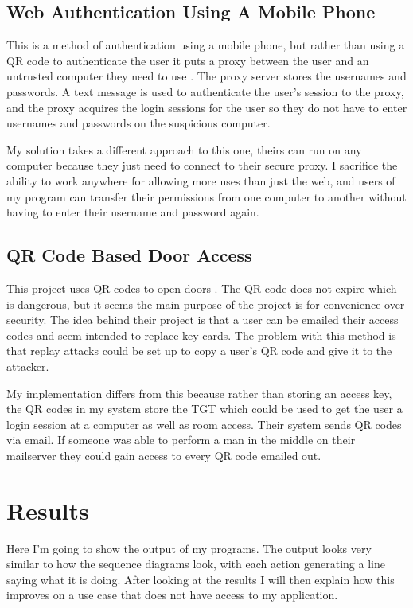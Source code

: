 \documentclass[]{report}   %
\begin{document}
\subsection {Web Authentication Using A Mobile Phone}
This is a method of authentication using a mobile phone, but rather than using a QR code to authenticate the user it puts a proxy between the user and an untrusted computer they need to use \cite{MobileRelated}. The proxy server stores the usernames and passwords. A text message is used to authenticate the user's session to the proxy, and the proxy acquires the login sessions for the user so they do not have to enter usernames and passwords on the suspicious computer.

My solution takes a different approach to this one, theirs can run on any computer because they just need to connect to their secure proxy. I sacrifice the ability to work anywhere for allowing more uses than just the web, and users of my program can transfer their permissions from one computer to another without having to enter their username and password again. 

\subsection{QR Code Based Door Access}
This project uses QR codes to open doors \cite{QRRelated}. The QR code does not expire which is dangerous, but it seems the main purpose of the project is for convenience over security. The idea behind their project is that a user can be emailed their access codes and seem intended to replace key cards. The problem with this method is that replay attacks could be set up to copy a user's QR code and give it to the attacker.

My implementation differs from this because rather than storing an access key, the QR codes in my system store the TGT which could be used to get the user a login session at a computer as well as room access. Their system sends QR codes via email. If someone was able to perform a man in the middle on their mailserver they could gain access to every QR code emailed out.


\section{Results}
Here I'm going to show the output of my programs. The output looks very similar to how the sequence diagrams look, with each action generating a line saying what it is doing. After looking at the results I will then explain how this improves on a use case that does not have access to my application.
\end{document}
